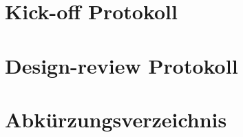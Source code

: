 \documentclass[
11pt, %
a4paper, %
BCOR25mm, %
DIV14, %
footsepline = false, %
headsepline, %
twoside, %
openright,
abstracton, %
listof=totocnumbered, %
bibliography=totocnumbered %
]{scrreprt}
\begin{document}
  \chapter{Kick-off Protokoll}\label{chapter:KickOffProtokoll}

  
  
  \cleardoublepage
  
   
  \chapter{Design-review Protokoll}\label{chapter:DesignReviewProtokoll}
  
  
  
  \cleardoublepage
  
  
  \chapter{Abkürzungsverzeichnis}\label{chapter:Abkuerzungsverzeichnis}

  
  
  \cleardoublepage
  
  
  \listoffigures
  
  \cleardoublepage
  
  
  \listoftables
  
  \cleardoublepage

    
\end{document}
